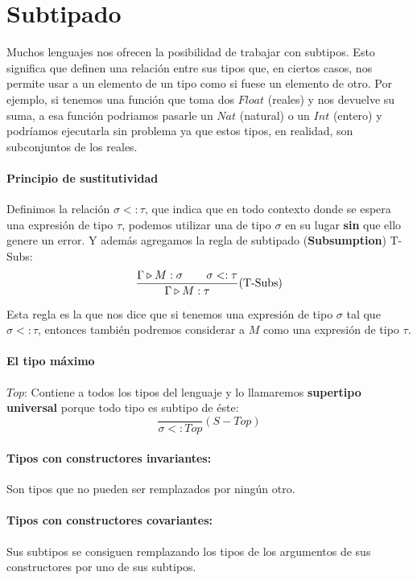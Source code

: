 \section{Subtipado}
Muchos lenguajes nos ofrecen la posibilidad de trabajar con subtipos. Esto significa que definen una relación entre sus tipos que, en ciertos casos, nos permite usar a un elemento de un tipo como si fuese un elemento de otro.  Por ejemplo, si tenemos una función que toma dos $Float$ (reales) y nos devuelve su suma, a esa función podriamos pasarle un $Nat$ (natural) o un $Int$ (entero) y podríamos ejecutarla sin problema ya que estos tipos, en realidad, son subconjuntos de los reales.

\paragraph{Principio de sustitutividad}
Definimos la relación $\sigma <: \tau$, que indica que en todo contexto donde se espera una expresión de tipo $\tau$, podemos utilizar una de tipo $\sigma$ en su lugar \textbf{sin} que ello genere un error. Y además agregamos la regla de subtipado (\textbf{Subsumption}) T-Subs:
$$\frac{\Gamma\triangleright M : \sigma~\hspace*{5mm}~\sigma <:\tau}{\Gamma\triangleright M : \tau}(\text{T-Subs})$$

Esta regla es la que nos dice que si tenemos una expresión de tipo $\sigma$ tal que $\sigma <: \tau$, entonces también podremos considerar a $M$ como una expresión de tipo $\tau$.
\paragraph{El tipo máximo} $Top$: Contiene a todos los tipos del lenguaje y lo llamaremos \textbf{supertipo universal} porque todo tipo es subtipo de éste:
$$\frac{}{\sigma <: Top}(S-Top)$$

\paragraph{Tipos con constructores invariantes:} Son tipos que no pueden ser remplazados por ningún otro.

\paragraph{Tipos con constructores covariantes:} Sus subtipos se consiguen remplazando los tipos de los argumentos de sus constructores por uno de sus subtipos.

